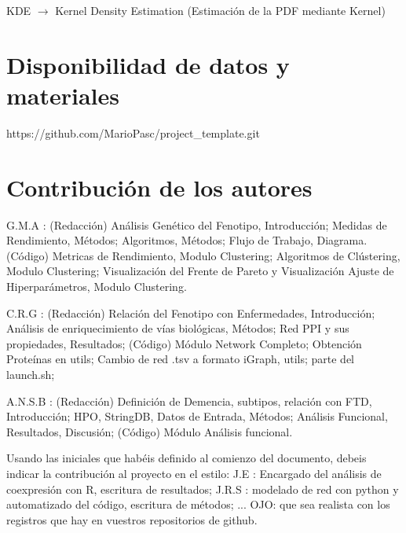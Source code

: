 \documentclass{bmcart}
\begin{document}
\begin{backmatter}
			KDE $\rightarrow$ Kernel Density Estimation (Estimación de la PDF mediante Kernel)
		
		\section*{Disponibilidad de datos y materiales}%
			https://github.com/MarioPasc/project\_template.git
		
		\section*{Contribución de los autores}
		
			G.M.A : (Redacción) Análisis Genético del Fenotipo, Introducción; Medidas de Rendimiento, Métodos; Algoritmos, Métodos; Flujo de Trabajo, Diagrama. (Código) Metricas de Rendimiento, Modulo Clustering; Algoritmos de Clústering, Modulo Clustering; Visualización del Frente de Pareto y Visualización Ajuste de Hiperparámetros, Modulo Clustering. 
			
			C.R.G : (Redacción) Relación del Fenotipo con Enfermedades, Introducción; Análisis de enriquecimiento de vías biológicas, Métodos; Red PPI y sus propiedades, Resultados; (Código) Módulo Network Completo; Obtención Proteínas en utils; Cambio de red .tsv a formato iGraph, utils; parte del launch.sh; 
			
			A.N.S.B : (Redacción) Definición de Demencia, subtipos, relación con FTD, Introducción; HPO, StringDB, Datos de Entrada, Métodos; Análisis Funcional, Resultados, Discusión; (Código) Módulo Análisis funcional. 
		
			Usando las iniciales que habéis definido al comienzo del documento, debeis indicar la contribución al proyecto en el estilo:
			J.E : Encargado del análisis de coexpresión con R, escritura de resultados; J.R.S : modelado de red con python y automatizado del código, escritura de métodos; ...
			OJO: que sea realista con los registros que hay en vuestros repositorios de github. 
		
		
		
	
	\end{backmatter}
\end{document}
